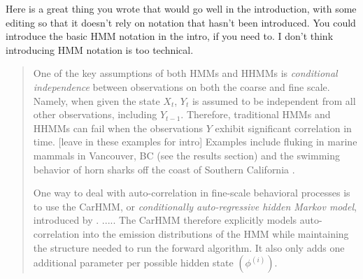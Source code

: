 Here is a great thing you wrote that would go well in the introduction, with some editing so that it doesn't rely on notation that hasn't been introduced. You could introduce the basic HMM notation in the intro, if you need to.  I don't think introducing HMM notation is too technical.
\begin{quote}
 One of the key assumptions of both HMMs and HHMMs is \textit{conditional independence} between observations on both the coarse and fine scale. Namely, when given the state $X_t$, $Y_t$ is assumed to be independent from all other observations, including $Y_{t-1}$. Therefore, traditional HMMs and HHMMs can fail when the observations $Y$ exhibit significant correlation in time.
 [leave in these examples for intro]  Examples include fluking in marine mammals in Vancouver, BC (see the results section) and the swimming behavior of horn sharks off the coast of Southern California \citep{Adam:2019}.

One way to deal with auto-correlation in fine-scale behavioral processes is to use the CarHMM, or \textit{conditionally auto-regressive hidden Markov model}, introduced by \citep{Lawler:2019}. .....  The CarHMM therefore explicitly models auto-correlation into the emission distributions of the HMM while maintaining the structure needed to run the forward algorithm. It also only adds one additional parameter per possible hidden state
$(\phi^{(i)})$. 
\end{quote}

\fi
